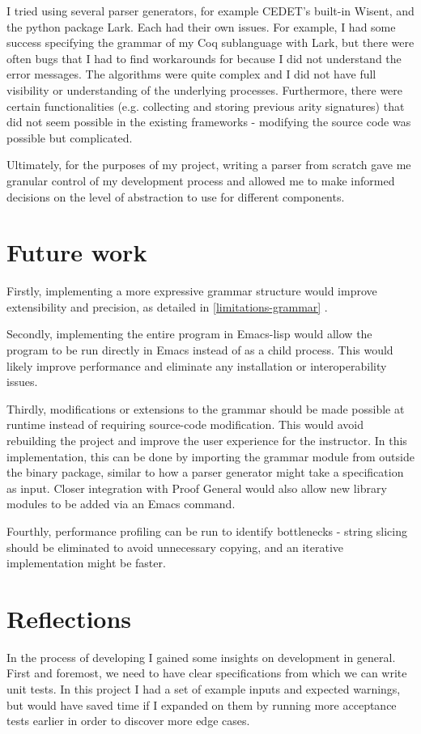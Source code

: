 I tried using several parser generators, for example CEDET's built-in Wisent, and the python package Lark. Each had their own issues. For example, I had some success specifying the grammar of my Coq sublanguage with Lark, but there were often bugs that I had to find workarounds for because I did not understand the error messages. The algorithms were quite complex and I did not have full visibility or understanding of the underlying processes. Furthermore, there were certain functionalities (e.g. collecting and storing previous arity signatures) that did not seem possible in the existing frameworks - modifying the source code was possible but complicated.

Ultimately, for the purposes of my project, writing a parser from scratch gave me granular control of my development process and allowed me to make informed decisions on the level of abstraction to use for different components.


\section{Future work}
Firstly, implementing a more expressive grammar structure would improve extensibility and precision, as detailed in \ref{limitations-grammar} .

Secondly, implementing the entire program in Emacs-lisp would allow the program to be run directly in Emacs instead of as a child process. This would likely improve performance and eliminate any installation or interoperability issues.

Thirdly, modifications or extensions to the grammar should be made possible at runtime instead of requiring source-code modification. This would avoid rebuilding the project and improve the user experience for the instructor. In this implementation, this can be done by importing the grammar module from outside the binary package, similar to how a parser generator might take a specification as input. Closer integration with Proof General would also allow new library modules to be added via an Emacs command.

Fourthly, performance profiling can be run to identify bottlenecks - string slicing should be eliminated to avoid unnecessary copying, and an iterative implementation might be faster.

\section{Reflections}
In the process of developing  I gained some insights on development in general. First and foremost, we need to have clear specifications from which we can write unit tests. In this project I had a set of example inputs and expected warnings, but would have saved time if I expanded on them by running more acceptance tests earlier in order to discover more edge cases.

